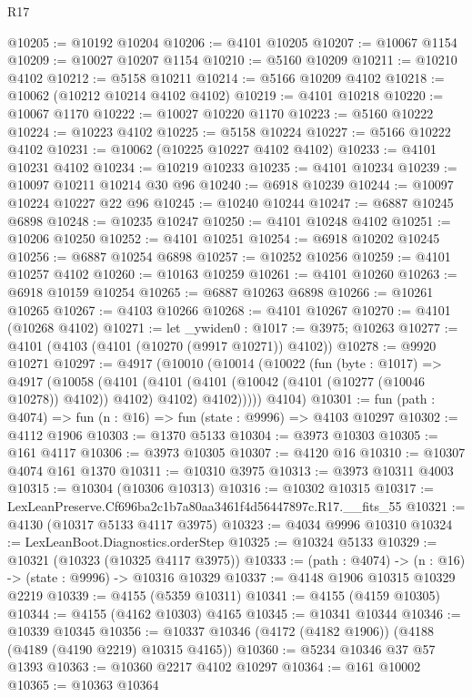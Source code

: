 \begin{lexlean}{R17}
\begin{coremodule}
@10205 := @10192 @10204
@10206 := @4101 @10205
@10207 := @10067 @1154
@10209 := @10027 @10207 @1154
@10210 := @5160 @10209
@10211 := @10210 @4102
@10212 := @5158 @10211
@10214 := @5166 @10209 @4102
@10218 := @10062 (@10212 @10214 @4102 @4102)
@10219 := @4101 @10218
@10220 := @10067 @1170
@10222 := @10027 @10220 @1170
@10223 := @5160 @10222
@10224 := @10223 @4102
@10225 := @5158 @10224
@10227 := @5166 @10222 @4102
@10231 := @10062 (@10225 @10227 @4102 @4102)
@10233 := @4101 @10231 @4102
@10234 := @10219 @10233
@10235 := @4101 @10234
@10239 := @10097 @10211 @10214 @30 @96
@10240 := @6918 @10239
@10244 := @10097 @10224 @10227 @22 @96
@10245 := @10240 @10244
@10247 := @6887 @10245 @6898
@10248 := @10235 @10247
@10250 := @4101 @10248 @4102
@10251 := @10206 @10250
@10252 := @4101 @10251
@10254 := @6918 @10202 @10245
@10256 := @6887 @10254 @6898
@10257 := @10252 @10256
@10259 := @4101 @10257 @4102
@10260 := @10163 @10259
@10261 := @4101 @10260
@10263 := @6918 @10159 @10254
@10265 := @6887 @10263 @6898
@10266 := @10261 @10265
@10267 := @4103 @10266
@10268 := @4101 @10267
@10270 := @4101 (@10268 @4102)
@10271 := let _ywiden0 : @1017 := @3975; @10263
@10277 := @4101 (@4103 (@4101 (@10270 (@9917 @10271)) @4102))
@10278 := @9920 @10271
@10297 := @4917
    (@10010
      (@10014
        (@10022
          (fun (byte : @1017) =>
          @4917
            (@10058
              (@4101
                (@4101 (@4101 (@10042 (@4101 (@10277 (@10046 @10278)) @4102)) @4102) @4102)
                @4102)))))
      @4104)
@10301 := fun (path : @4074) => fun (n : @16) => fun (state : @9996) => @4103 @10297
@10302 := @4112 @1906
@10303 := @1370 @5133
@10304 := @3973 @10303
@10305 := @161 @4117
@10306 := @3973 @10305
@10307 := @4120 @16
@10310 := @10307 @4074 @161 @1370
@10311 := @10310 @3975
@10313 := @3973 @10311 @4003
@10315 := @10304 (@10306 @10313)
@10316 := @10302 @10315
@10317 := LexLeanPreserve.Cf696ba2c1b7a80aa3461f4d56447897c.R17.__fits_55
@10321 := @4130 (@10317 @5133 @4117 @3975)
@10323 := @4034 @9996 @10310
@10324 := LexLeanBoot.Diagnostics.orderStep
@10325 := @10324 @5133
@10329 := @10321 (@10323 (@10325 @4117 @3975))
@10333 := (path : @4074) -> (n : @16) -> (state : @9996) -> @10316 @10329
@10337 := @4148 @1906 @10315 @10329 @2219
@10339 := @4155 (@5359 @10311)
@10341 := @4155 (@4159 @10305)
@10344 := @4155 (@4162 @10303) @4165
@10345 := @10341 @10344
@10346 := @10339 @10345
@10356 := @10337 @10346 (@4172 (@4182 @1906)) (@4188 (@4189 (@4190 @2219) @10315 @4165))
@10360 := @5234 @10346 @37 @57 @1393
@10363 := @10360 @2217 @4102 @10297
@10364 := @161 @10002
@10365 := @10363 @10364

\end{coremodule}
\end{lexlean}
